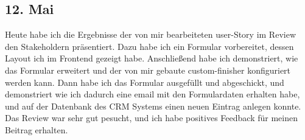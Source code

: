 \subsection{12. Mai}
Heute habe ich die Ergebnisse der von mir bearbeiteten user-Story im Review den Stakeholdern präsentiert. Dazu habe ich ein Formular vorbereitet, dessen Layout ich im Frontend gezeigt habe. Anschließend habe ich demonstriert, wie das Formular erweitert und der von mir gebaute custom-finisher konfiguriert werden kann. Dann habe ich das Formular ausgefüllt und abgeschickt, und demonstriert wie ich dadurch eine email mit den Formulardaten erhalten habe, und auf der Datenbank des CRM Systems einen neuen Eintrag anlegen konnte. Das Review war sehr gut pesucht, und ich habe positives Feedback für meinen Beitrag erhalten.